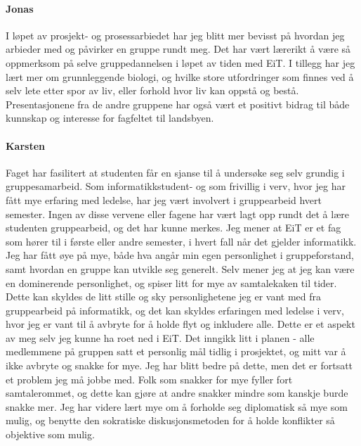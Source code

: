 \paragraph{Jonas}
I løpet av prosjekt- og prosessarbiedet har jeg blitt mer bevisst på hvordan jeg arbieder med og påvirker en gruppe rundt meg.
Det har vært lærerikt å være så oppmerksom på selve gruppedannelsen i løpet av tiden med EiT.
I tillegg har jeg lært mer om grunnleggende biologi, og hvilke store utfordringer som finnes ved å selv lete etter spor av liv, eller forhold hvor liv kan oppstå og bestå.
Presentasjonene fra de andre gruppene har også vært et positivt bidrag til både kunnskap og interesse for fagfeltet til landsbyen.

\paragraph{Karsten}
Faget har fasilitert at studenten får en sjanse til å undersøke seg selv grundig i gruppesamarbeid. 
Som informatikkstudent- og som frivillig i verv, hvor jeg har fått mye erfaring med ledelse, har jeg vært involvert i gruppearbeid hvert semester. 
Ingen av disse vervene eller fagene har vært lagt opp rundt det å lære studenten gruppearbeid, og det har kunne merkes. 
Jeg mener at EiT er et fag som hører til i første eller andre semester, i hvert fall når det gjelder informatikk. 
Jeg har fått øye på mye, både hva angår min egen personlighet i gruppeforstand, samt hvordan en gruppe kan utvikle seg generelt. 
Selv mener jeg at jeg kan være en dominerende personlighet, og spiser litt for mye av samtalekaken til tider. 
Dette kan skyldes de litt stille og sky personlighetene jeg er vant med fra gruppearbeid på informatikk, og det kan skyldes erfaringen med ledelse i verv, hvor jeg er vant til å avbryte for å holde flyt og inkludere alle. 
Dette er et aspekt av meg selv jeg kunne ha roet ned i EiT. Det inngikk litt i planen - alle medlemmene på gruppen satt et personlig mål tidlig i prosjektet, og mitt var å ikke avbryte og snakke for mye. 
Jeg har blitt bedre på dette, men det er fortsatt et problem jeg må jobbe med. 
Folk som snakker for mye fyller fort samtalerommet, og dette kan gjøre at andre snakker mindre som kanskje burde snakke mer. 
Jeg har videre lært mye om å forholde seg diplomatisk så mye som mulig, og benytte den sokratiske diskusjonsmetoden for å holde konflikter så objektive som mulig. 

